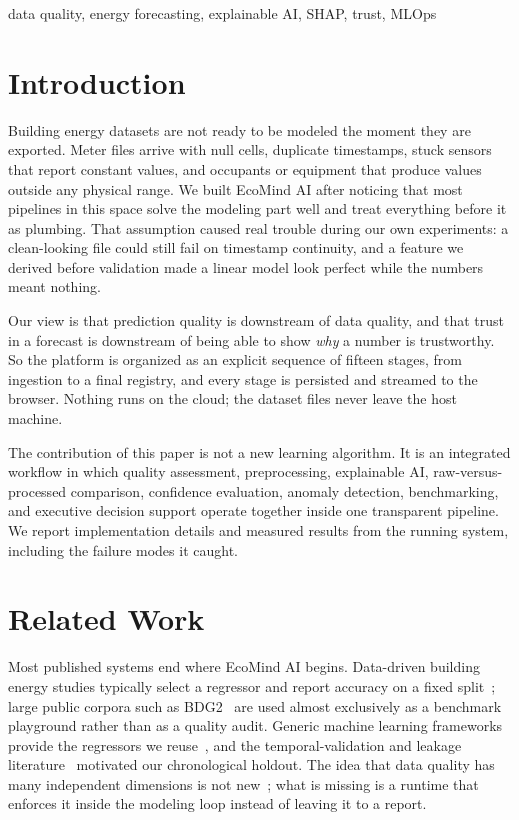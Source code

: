 \documentclass[conference]{IEEEtran}
\begin{document}
\begin{IEEEkeywords}
data quality, energy forecasting, explainable AI, SHAP, trust, MLOps
\end{IEEEkeywords}

\section{Introduction}

Building energy datasets are not ready to be modeled the moment they are exported. Meter files arrive with null cells, duplicate timestamps, stuck sensors that report constant values, and occupants or equipment that produce values outside any physical range. We built EcoMind AI after noticing that most pipelines in this space solve the modeling part well and treat everything before it as plumbing. That assumption caused real trouble during our own experiments: a clean-looking file could still fail on timestamp continuity, and a feature we derived before validation made a linear model look perfect while the numbers meant nothing.

Our view is that prediction quality is downstream of data quality, and that trust in a forecast is downstream of being able to show \emph{why} a number is trustworthy. So the platform is organized as an explicit sequence of fifteen stages, from ingestion to a final registry, and every stage is persisted and streamed to the browser. Nothing runs on the cloud; the dataset files never leave the host machine.

The contribution of this paper is not a new learning algorithm. It is an integrated workflow in which quality assessment, preprocessing, explainable AI, raw-versus-processed comparison, confidence evaluation, anomaly detection, benchmarking, and executive decision support operate together inside one transparent pipeline. We report implementation details and measured results from the running system, including the failure modes it caught.

\section{Related Work}

Most published systems end where EcoMind AI begins. Data-driven building energy studies typically select a regressor and report accuracy on a fixed split~\cite{amasyali:2018, chen:2016}; large public corpora such as BDG2~\cite{miller:2020} are used almost exclusively as a benchmark playground rather than as a quality audit. Generic machine learning frameworks provide the regressors we reuse~\cite{breiman:2001, pedregosa:2011}, and the temporal-validation and leakage literature~\cite{bergmeir:2012, hyndman:2021} motivated our chronological holdout. The idea that data quality has many independent dimensions is not new~\cite{wang:1996}; what is missing is a runtime that enforces it inside the modeling loop instead of leaving it to a report.
\end{document}
